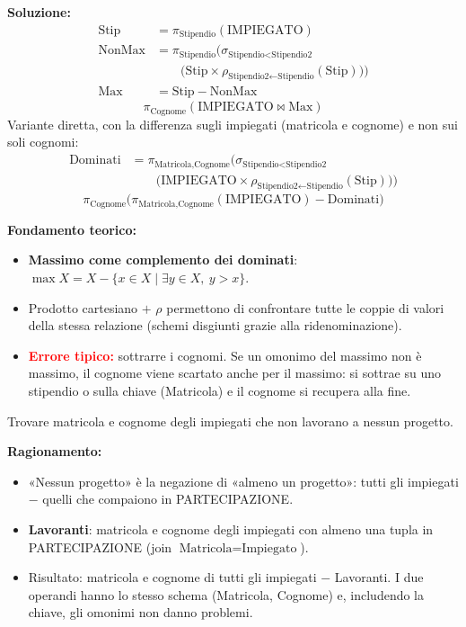 \documentclass[12pt, a4paper]{article}
\begin{document}
\textbf{Soluzione:}
\begin{align*}
\text{Stip} &= \pi_{\text{Stipendio}}(\text{IMPIEGATO})\\
\text{NonMax} &= \pi_{\text{Stipendio}}\Big(\sigma_{\text{Stipendio}<\text{Stipendio2}}\\
&\qquad\big(\text{Stip}\times\rho_{\text{Stipendio2}\leftarrow\text{Stipendio}}(\text{Stip})\big)\Big)\\
\text{Max} &= \text{Stip}-\text{NonMax}
\end{align*}
$$\pi_{\text{Cognome}}(\text{IMPIEGATO}\bowtie\text{Max})$$
Variante diretta, con la differenza sugli impiegati (matricola e cognome) e non sui soli cognomi:
\begin{align*}
\text{Dominati} &= \pi_{\text{Matricola},\text{Cognome}}\Big(\sigma_{\text{Stipendio}<\text{Stipendio2}}\\
&\qquad\big(\text{IMPIEGATO}\times\rho_{\text{Stipendio2}\leftarrow\text{Stipendio}}(\text{Stip})\big)\Big)
\end{align*}
$$\pi_{\text{Cognome}}\big(\pi_{\text{Matricola},\text{Cognome}}(\text{IMPIEGATO})-\text{Dominati}\big)$$

\textbf{Fondamento teorico:}
\begin{itemize}
\item \textbf{Massimo come complemento dei dominati}: $\max X=X-\{x\in X\mid\exists y\in X,\ y>x\}$.
\item Prodotto cartesiano $+$ $\rho$ permettono di confrontare tutte le coppie di valori della stessa relazione (schemi disgiunti grazie alla ridenominazione).
\item \textcolor{red}{\textbf{Errore tipico:}} sottrarre i cognomi. Se un omonimo del massimo non è massimo, il cognome viene scartato anche per il massimo: si sottrae su uno stipendio o sulla chiave (Matricola) e il cognome si recupera alla fine.
\end{itemize}

\begin{tcolorbox}[colback=lightergray!10, colframe=tocsec, title=\textbf{Esercizio 1.12}]
Trovare matricola e cognome degli impiegati che non lavorano a nessun progetto.
\end{tcolorbox}

\textbf{Ragionamento:}
\begin{itemize}
\item «Nessun progetto» è la negazione di «almeno un progetto»: tutti gli impiegati $-$ quelli che compaiono in PARTECIPAZIONE.
\item \textbf{Lavoranti}: matricola e cognome degli impiegati con almeno una tupla in PARTECIPAZIONE (join $\text{Matricola}=\text{Impiegato}$).
\item Risultato: matricola e cognome di tutti gli impiegati $-$ Lavoranti. I due operandi hanno lo stesso schema (Matricola, Cognome) e, includendo la chiave, gli omonimi non danno problemi.
\end{itemize}
\end{document}
